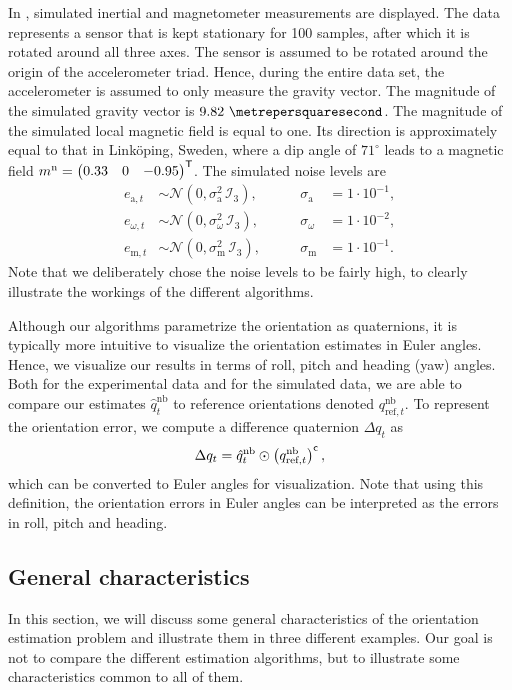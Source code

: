 In , simulated inertial and magnetometer measurements are displayed. The data represents a sensor that is kept stationary for 100 samples, after which it is rotated around all three axes. The sensor is assumed to be rotated around the origin of the accelerometer triad. Hence, during the entire data set, the accelerometer is assumed to only measure the gravity vector. The magnitude of the simulated gravity vector is $9.82~\metrepersquaresecond$. The magnitude of the simulated local magnetic field is equal to one. Its direction is approximately equal to that in Link\"oping, Sweden, where a dip angle of $71^\circ$ leads to a magnetic field  $m^\text{n} = \begin{pmatrix} 0.33 & 0 & - 0.95 \end{pmatrix}^{\mathsf{T}}$. The simulated noise levels are
\begin{align*}
e_{\text{a},t} &\sim \mathcal{N}(0, \sigma_\text{a}^2 \, \mathcal{I}_3), \qquad & \sigma_\text{a} &= 1 \cdot 10^{-1}, \\
e_{\omega,t} &\sim \mathcal{N}(0, \sigma_\omega^2 \, \mathcal{I}_3), \qquad & \sigma_\omega &= 1 \cdot 10^{-2}, \\
e_{\text{m},t} &\sim \mathcal{N}(0, \sigma_\text{m}^2 \, \mathcal{I}_3), \qquad & \sigma_\text{m} &= 1 \cdot 10^{-1}. 
\end{align*}
Note that we deliberately chose the noise levels to be fairly high, to clearly illustrate the workings of the different algorithms. 

Although our algorithms parametrize the orientation as quaternions, it is typically more intuitive to visualize the orientation estimates in Euler angles. Hence, we visualize our results in terms of roll, pitch and heading (yaw) angles. Both for the experimental data and for the simulated data, we are able to compare our estimates $\hat{q}^{\text{nb}}_t$ to reference orientations denoted $q^{\text{nb}}_{\text{ref},t}$. To represent the orientation error, we compute a difference quaternion $\Delta q_t$ as
\begin{align}
\Delta q_t = \hat{q}^{\text{nb}}_t \odot \left( q_{\text{ref},t}^\text{nb} \right)^{\mathsf{c}},
\end{align}
which can be converted to Euler angles for visualization. Note that using this definition, the orientation errors in Euler angles can be interpreted as the errors in roll, pitch and heading.

\subsection{General characteristics}
In this section, we will discuss some general characteristics of the orientation estimation problem and illustrate them in three different examples. Our goal is not to compare the different estimation algorithms, but to illustrate some characteristics common to all of them. 

